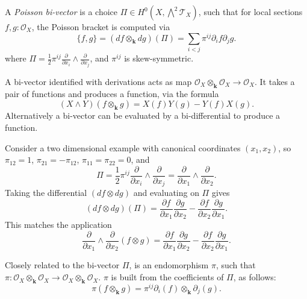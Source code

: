     \begin{defn}
    \label{defn:bi_vect}
    A \emph{Poisson bi-vector} is a choice \( \Pi \in   H^0(X,\bigwedge^2 \mathcal{T}_X) \), such that for local sections \( f ,g : \mathcal{O}_X\), the Poisson bracket is computed via
    \begin{equation}
    \label{eqn:bi_vect}    
    \{ f,g\} = (df \otimes_{\mathbf{k}} dg ) ( \Pi) = \sum_{i<j} \pi^{ij} \partial_i f \partial_j g.
    \end{equation}
    where \( \Pi =  \frac{1}{2} \pi^{ij} \frac{\partial}{\partial x_i} \wedge \frac{\partial}{\partial x_j} \), and \( \pi^{ij}\) is skew-symmetric.
    \end{defn}
    
    \begin{ex} 
    A bi-vector identified with derivations acts as  map \( \mathcal{O}_X \otimes_{\mathbf{k}} \mathcal{O}_X \rightarrow \mathcal{O}_X\). It takes a pair of functions and produces a function, via the formula 
    \[ (X \wedge Y) ( f \otimes_{\mathbf{k}} g) = X (f) Y (g) - Y (f) X (g). \]
    Alternatively a bi-vector can be evaluated by a bi-differential to produce a function.
    
    Consider a two dimensional example with canonical coordinates \( (x_1,x_2)\), so \( \pi_{12}=1\), \(\pi_{21} = -\pi_{12}\), \(\pi_{11}=\pi_{22}=0\), and 
    \[ \Pi = \frac{1}{2} \pi^{ij} \frac{\partial}{\partial x_i }\wedge \frac{\partial}{\partial x_j } =  \frac{\partial}{\partial x_1 }\wedge \frac{\partial}{\partial x_2 }.\]
    Taking the differential 
    \( ( d f \otimes d g )\) and evaluating on \( \Pi \) gives
    \[ ( d f \otimes d g )( \Pi ) =  \frac{ \partial f}{\partial x_1}\frac{\partial g}{\partial x_2} - \frac{\partial f}{\partial x_2 }\frac{\partial g}{\partial x_1}.\]
    This matches the application
    \[ \frac{\partial}{\partial x_1 }\wedge \frac{\partial}{\partial x_2 } ( f \otimes g) = \frac{ \partial f}{\partial x_1}\frac{\partial g}{\partial x_2} - \frac{\partial f}{\partial x_2 }\frac{\partial g}{\partial x_1}. \] 
    
    
    \end{ex}
    
    
    
    Closely related to the bi-vector \( \Pi\), is an endomorphism  \( \pi\), such that \( \pi : \mathcal{O}_X \otimes_{\mathbf{k}} \mathcal{O}_X \rightarrow \mathcal{O}_X \otimes_{\mathbf{k}} \mathcal{O}_X\).
    \( \pi \) is built from the coefficients of \( \Pi\), as follows:  
    \[ \pi(f\otimes_{\mathbf{k}} g) = \pi^{ij} \partial_i (f) \otimes_{\mathbf{k}} \partial_j (g).\]
    
